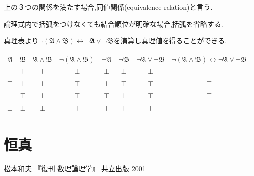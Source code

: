 上の３つの関係を満たす場合,同値関係(equivalence relation)と言う.

論理式内で括弧をつけなくても結合順位が明確な場合,括弧を省略する.

真理表より$\lnot (\mathfrak{A} \land \mathfrak{B}) \leftrightarrow  \lnot \mathfrak{A} \lor \lnot \mathfrak{B}$を演算し真理値を得ることができる.
\begin{center}
 \begin{tabular}{|c c||c|c||c|c|c||c|}
  \hline
  $\mathfrak{A}$ & $\mathfrak{B}$ &
		  $\mathfrak{A} \land \mathfrak{B}$ & $\lnot (\mathfrak{A} \land \mathfrak{B})$ &
				  $\lnot \mathfrak{A}$ & $\lnot \mathfrak{B}$ & $\lnot \mathfrak{A} \lor \lnot \mathfrak{B}$ &
							  $\lnot (\mathfrak{A} \land \mathfrak{B}) \leftrightarrow  \lnot \mathfrak{A} \lor \lnot \mathfrak{B}$ \\
  \hhline{|==#=|=#=|=|=#=|}
  $\top$ & $\top$ & $\top$ & $\bot$ & $\bot$ & $\bot$ & $\bot$ & $\top$ \\
  \hline
  $\top$ & $\bot$ & $\bot$ & $\top$ & $\bot$ & $\top$ & $\top$ & $\top$ \\
  \hline
  $\bot$ & $\top$ & $\bot$ & $\top$ & $\top$ & $\bot$ & $\top$ & $\top$ \\
  \hline
  $\bot$ & $\bot$ & $\bot$ & $\top$ & $\top$ & $\top$ & $\top$ & $\top$ \\
  \hline
 \end{tabular}
\end{center}


\section{恒真}

\begin{thebibliography}{9}
		 松本和夫 『復刊 数理論理学』 共立出版 2001
\end{thebibliography}